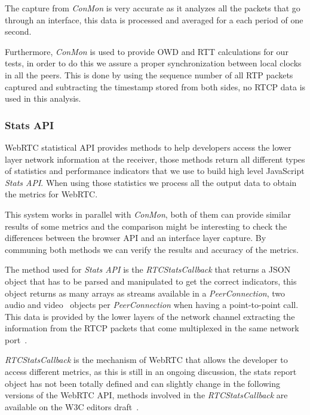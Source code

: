 The capture from {\it ConMon} is very accurate as it analyzes all the packets that go through an interface, this data is processed and averaged for a each period of one second. 


Furthermore, {\it ConMon} is used to provide OWD and RTT calculations for our tests, in order to do this we assure a proper synchronization between local clocks in all the peers. This is done by using the sequence number of all RTP packets captured and subtracting the timestamp stored from both sides, no RTCP data is used in this analysis.

\subsubsection{Stats API}

WebRTC statistical API provides methods to help developers access the lower layer network information at the receiver, those methods return all different types of statistics and performance indicators that we use to build high level JavaScript {\it Stats API}. When using those statistics we process all the output data to obtain the metrics for WebRTC.

This system works in parallel with {\it ConMon}, both of them can provide similar results of some metrics and the comparison might be interesting to check the differences between the browser API and an interface layer capture. By communing both methods we can verify the results and accuracy of the metrics.

The method used for {\it Stats API} is the {\it RTCStatsCallback} that returns a JSON object that has to be parsed and manipulated to get the correct indicators, this object returns as many arrays as streams available in a {\it PeerConnection}, two audio and video~\cite{editorWebRTCdraft} objects per {\it PeerConnection} when having a point-to-point call. This data is provided by the lower layers of the network channel extracting the information from the RTCP packets that come multiplexed in the same network port~\cite{rtpusageIETF}.

{\it RTCStatsCallback} is the mechanism of WebRTC that allows the developer to access different metrics, as this is still in an ongoing discussion, the stats report object has not been totally defined and can slightly change in the following versions of the WebRTC API, methods involved in the {\it RTCStatsCallback} are available on the W3C editors draft~\cite{editorWebRTCdraft}. 

